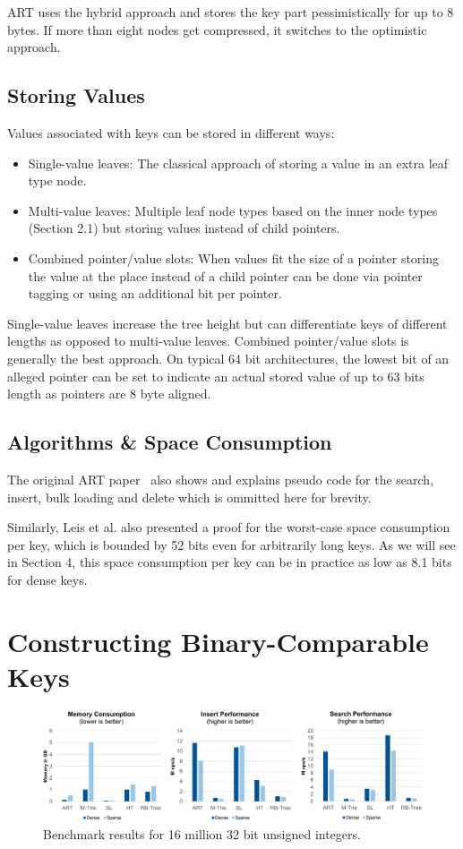 \documentclass[acmtog, nonacm]{acmart}
\begin{document}
ART uses the hybrid approach and stores the key part pessimistically for up to 8 bytes. If more than eight nodes 
get compressed, it switches to the optimistic approach.

\subsection{Storing Values}
Values associated with keys can be stored in different ways:
\begin{itemize}
    \item Single-value leaves: The classical approach of storing a value in an extra leaf type node.
    \item Multi-value leaves: Multiple leaf node types based on the inner node types (Section 2.1) 
    but storing values instead of child pointers.
    \item Combined pointer/value slots: When values fit the size of a pointer storing the value at the place instead 
    of a child pointer can be done via pointer tagging or using an additional bit per pointer.
\end{itemize}

Single-value leaves increase the tree height but can differentiate keys of different lengths as opposed to 
multi-value leaves. Combined pointer/value slots is generally the best approach. On typical 64 bit architectures, 
the lowest bit of an alleged pointer can be set to indicate an actual stored value of up to 63 bits length as 
pointers are 8 byte aligned.

\subsection{Algorithms \& Space Consumption}
The original ART paper~\cite{6544812} also shows and explains pseudo code for the search, insert, 
bulk loading and delete which is ommitted here for brevity.

Similarly, Leis et al. also presented a proof for the worst-case space consumption per key, which is bounded by 52 bits even for
arbitrarily long keys. As we will see in Section 4, this space consumption per key can be in practice as low as 8.1 bits
for dense keys.

\section{Constructing Binary-Comparable Keys}

\begin{figure}
    \centering
    \includegraphics[width=\textwidth]{images/06-art-micro-benchmark-16.PNG}
    \caption{Benchmark results for 16 million 32 bit unsigned integers.}
    \label{fig:art-micro-benchmark-16}
\end{figure}
\end{document}
